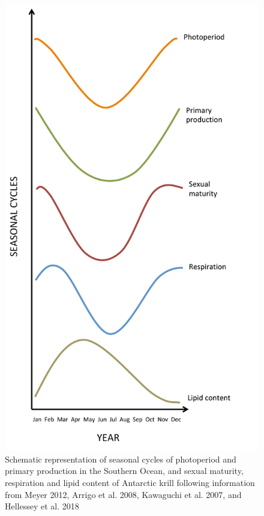 \begin{figure}
        \caption{Schematic representation of seasonal cycles of photoperiod and
        primary production in the Southern Ocean, and sexual maturity,
        respiration and lipid content of Antarctic krill following information
        from Meyer 2012, Arrigo et al. 2008, Kawaguchi et al. 2007, and
        Hellessey et al. 2018}
        \centering
        \includegraphics[width=0.85\pagewidth]{../Figures/Figure2.pdf}
\end{figure}

